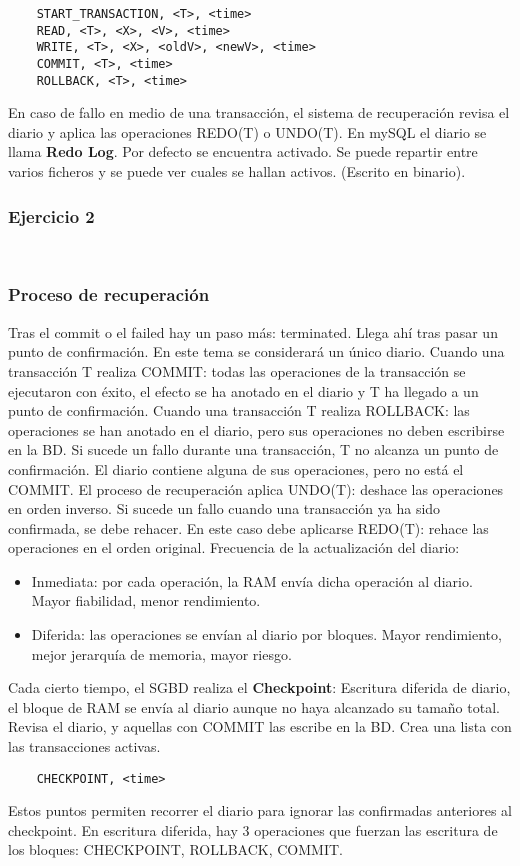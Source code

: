 \documentclass{article}
\begin{document}
\begin{verbatim}
	START_TRANSACTION, <T>, <time>
	READ, <T>, <X>, <V>, <time>
	WRITE, <T>, <X>, <oldV>, <newV>, <time>
	COMMIT, <T>, <time>
	ROLLBACK, <T>, <time>
\end{verbatim}
En caso de fallo en medio de una transacción, el sistema de recuperación revisa el diario y aplica las operaciones REDO(T) o UNDO(T). 
En mySQL el diario se llama \textbf{Redo Log}. Por defecto se encuentra activado. Se puede repartir entre varios ficheros y se puede ver cuales se hallan activos. (Escrito en binario).
\subsubsection{Ejercicio 2}
\begin{verbatim}
	
\end{verbatim}
\subsubsection{Proceso de recuperación}
Tras el commit o el failed hay un paso más: terminated. Llega ahí tras pasar un punto de confirmación.
En este tema se considerará un único diario. 
Cuando una transacción T realiza COMMIT: todas las operaciones de la transacción se ejecutaron con éxito, el efecto se ha anotado en el diario y T ha llegado a un punto de confirmación.
Cuando una transacción T realiza ROLLBACK: las operaciones se han anotado en el diario, pero sus operaciones no deben escribirse en la BD. 
Si sucede un fallo durante una transacción, T no alcanza un punto de confirmación. El diario contiene alguna de sus operaciones, pero no está el COMMIT. El proceso de recuperación aplica UNDO(T): deshace las operaciones en orden inverso.
Si sucede un fallo cuando una transacción ya ha sido confirmada, se debe rehacer. En este caso debe aplicarse REDO(T): rehace las operaciones en el orden original.
Frecuencia de la actualización del diario:
\begin{itemize}
	\item Inmediata: por cada operación, la RAM envía dicha operación al diario. Mayor fiabilidad, menor rendimiento.
	\item Diferida: las operaciones se envían al diario por bloques. Mayor rendimiento, mejor jerarquía de memoria, mayor riesgo. 
\end{itemize}
Cada cierto tiempo, el SGBD realiza el \textbf{Checkpoint}: 
Escritura diferida de diario, el bloque de RAM se envía al diario aunque no haya alcanzado su tamaño total. Revisa el diario, y aquellas con COMMIT las escribe en la BD. Crea una lista con las transacciones activas. 
\begin{verbatim}
	CHECKPOINT, <time>
\end{verbatim}
Estos puntos permiten recorrer el diario para ignorar las confirmadas anteriores al checkpoint. En escritura diferida, hay 3 operaciones que fuerzan las escritura de los bloques: CHECKPOINT, ROLLBACK, COMMIT.
\end{document}
